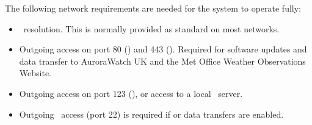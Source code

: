 The following network requirements are needed for the system to
operate fully:
\begin{itemize}
\item \dns\ resolution. This is normally provided
  as standard on most networks.
\item Outgoing access on port 80 (\http) and 443 (\https). Required
  for software updates and data transfer to AuroraWatch UK and the Met
  Office Weather Observations Website.
\item Outgoing access on port 123 (\ntp), or access to a local \ntp\
  server.
\item Outgoing \ssh\ access (port 22) is required if  or
  \code{rrsync} data transfers are enabled.
\end{itemize}




